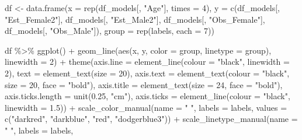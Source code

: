 \documentclass[
  letterpaper,
  DIV=11,
  numbers=noendperiod]{scrreprt}
\newenvironment{Shaded}{\begin{snugshade}}{\end{snugshade}}
\newcommand{\AttributeTok}[1]{\textcolor[rgb]{0.40,0.45,0.13}{#1}}
\newcommand{\DecValTok}[1]{\textcolor[rgb]{0.68,0.00,0.00}{#1}}
\newcommand{\FloatTok}[1]{\textcolor[rgb]{0.68,0.00,0.00}{#1}}
\newcommand{\FunctionTok}[1]{\textcolor[rgb]{0.28,0.35,0.67}{#1}}
\newcommand{\NormalTok}[1]{\textcolor[rgb]{0.00,0.23,0.31}{#1}}
\newcommand{\OtherTok}[1]{\textcolor[rgb]{0.00,0.23,0.31}{#1}}
\newcommand{\SpecialCharTok}[1]{\textcolor[rgb]{0.37,0.37,0.37}{#1}}
\newcommand{\StringTok}[1]{\textcolor[rgb]{0.13,0.47,0.30}{#1}}
\begin{document}
\begin{Shaded}
\begin{Highlighting}[]
\NormalTok{df }\OtherTok{\textless{}{-}} \FunctionTok{data.frame}\NormalTok{(}\AttributeTok{x =} \FunctionTok{rep}\NormalTok{(df\_models[, }\StringTok{"Age"}\NormalTok{], }\AttributeTok{times =} \DecValTok{4}\NormalTok{), }\AttributeTok{y =} \FunctionTok{c}\NormalTok{(df\_models[, }\StringTok{"Est\_Female2"}\NormalTok{],}
\NormalTok{    df\_models[, }\StringTok{"Est\_Male2"}\NormalTok{], df\_models[, }\StringTok{"Obs\_Female"}\NormalTok{], df\_models[, }\StringTok{"Obs\_Male"}\NormalTok{]),}
    \AttributeTok{group =} \FunctionTok{rep}\NormalTok{(labels, }\AttributeTok{each =} \DecValTok{7}\NormalTok{))}

\NormalTok{df }\SpecialCharTok{\%\textgreater{}\%}
    \FunctionTok{ggplot}\NormalTok{() }\SpecialCharTok{+} \FunctionTok{geom\_line}\NormalTok{(}\FunctionTok{aes}\NormalTok{(x, y, }\AttributeTok{color =}\NormalTok{ group, }\AttributeTok{linetype =}\NormalTok{ group), }\AttributeTok{linewidth =} \DecValTok{2}\NormalTok{) }\SpecialCharTok{+}
    \FunctionTok{theme}\NormalTok{(}\AttributeTok{axis.line =} \FunctionTok{element\_line}\NormalTok{(}\AttributeTok{colour =} \StringTok{"black"}\NormalTok{, }\AttributeTok{linewidth =} \DecValTok{2}\NormalTok{), }\AttributeTok{text =} \FunctionTok{element\_text}\NormalTok{(}\AttributeTok{size =} \DecValTok{20}\NormalTok{),}
        \AttributeTok{axis.text =} \FunctionTok{element\_text}\NormalTok{(}\AttributeTok{colour =} \StringTok{"black"}\NormalTok{, }\AttributeTok{size =} \DecValTok{20}\NormalTok{, }\AttributeTok{face =} \StringTok{"bold"}\NormalTok{), }\AttributeTok{axis.title =} \FunctionTok{element\_text}\NormalTok{(}\AttributeTok{size =} \DecValTok{24}\NormalTok{,}
            \AttributeTok{face =} \StringTok{"bold"}\NormalTok{), }\AttributeTok{axis.ticks.length =} \FunctionTok{unit}\NormalTok{(}\FloatTok{0.25}\NormalTok{, }\StringTok{"cm"}\NormalTok{), }\AttributeTok{axis.ticks =} \FunctionTok{element\_line}\NormalTok{(}\AttributeTok{colour =} \StringTok{"black"}\NormalTok{,}
            \AttributeTok{linewidth =} \FloatTok{1.5}\NormalTok{)) }\SpecialCharTok{+} \FunctionTok{scale\_color\_manual}\NormalTok{(}\AttributeTok{name =} \StringTok{" "}\NormalTok{, }\AttributeTok{labels =}\NormalTok{ labels, }\AttributeTok{values =} \FunctionTok{c}\NormalTok{(}\StringTok{"darkred"}\NormalTok{,}
    \StringTok{"darkblue"}\NormalTok{, }\StringTok{"red"}\NormalTok{, }\StringTok{"dodgerblue3"}\NormalTok{)) }\SpecialCharTok{+} \FunctionTok{scale\_linetype\_manual}\NormalTok{(}\AttributeTok{name =} \StringTok{" "}\NormalTok{, }\AttributeTok{labels =}\NormalTok{ labels,}

\end{Highlighting}
\end{Shaded}
\end{document}
